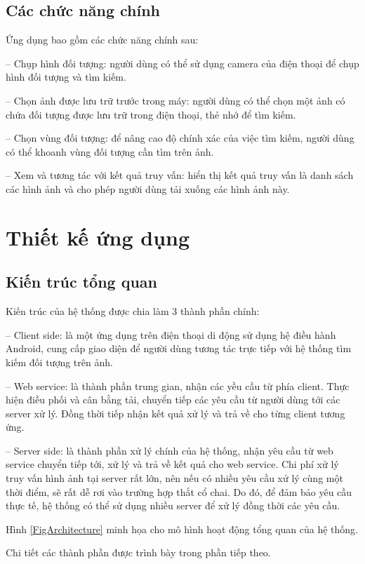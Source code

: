 	\subsection{Các chức năng chính}
Ứng dụng bao gồm các chức năng chính sau:

-- Chụp hình đối tượng: người dùng có thể sử dụng camera của điện thoại để chụp hình đối tượng và tìm kiếm.

-- Chọn ảnh được lưu trữ trước trong máy: người dùng có thể chọn một ảnh có chứa đối tượng được lưu trữ trong điện thoại, thẻ nhớ để tìm kiếm.

-- Chọn vùng đối tượng: để nâng cao độ chính xác của việc tìm kiếm, người dùng có thể khoanh vùng đối tượng cần tìm trên ảnh.

-- Xem và tương tác với kết quả truy vấn: hiển thị kết quả truy vấn là danh sách các hình ảnh và cho phép người dùng tải xuống các hình ảnh này.

\section{Thiết kế ứng dụng}
\label{c5-thietke}

	\subsection{Kiến trúc tổng quan}
Kiến trúc của hệ thống được chia làm 3 thành phần chính:

-- Client side: là một ứng dụng trên điện thoại di động sử dụng hệ điều hành Android, cung cấp giao diện để người dùng tương tác trực tiếp với hệ thống tìm kiếm đối tượng trên ảnh.

-- Web service: là thành phần trung gian, nhận các yều cầu từ phía client. Thực hiện điều phối và cân bằng tải, chuyển tiếp các yêu cầu từ người dùng tới các server xử lý. Đồng thời tiếp nhận kết quả xử lý và trả về cho từng client tương ứng.

-- Server side: là thành phần xử lý chính của hệ thống, nhận yêu cầu từ web service chuyển tiếp tới, xử lý và trả về kết quả cho web service. Chi phí xử lý truy vấn hình ảnh tại server rất lớn, nên nếu có nhiều yêu cầu xử lý cùng một thời điểm, sẽ rất dễ rơi vào trường hợp thắt cổ chai. Do đó, để đảm bảo yêu cầu thực tế, hệ thống có thể sử dụng nhiều server để xử lý đồng thời các yêu cầu.

Hình \ref{FigArchitecture} minh họa cho mô hình hoạt động tổng quan của hệ thống.

Chi tiết các thành phần được trình bày trong phần tiếp theo.

